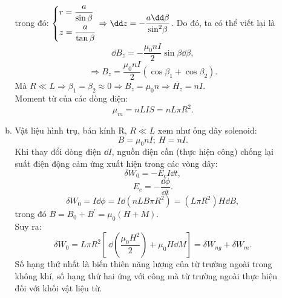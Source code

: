 \begin{loigiai}
\begin{enumerate}[1)]
\begin{enumerate}[a)]
\begin{center}

            \end{center}
            trong đó: $\left\{ \begin{gathered}
              r = \dfrac{a}{{\sin \beta }} \hfill \\
              z = \dfrac{a}{{\tan \beta }} \hfill \\ 
            \end{gathered}  \right. \Rightarrow \dd z =  - \dfrac{{a \dd\beta }}{{{{\sin }^2}\beta }}$. Do đó, ta có thể viết lại là            \[{\dd}{{{B}}_{z}}=-\dfrac{{{\mu }_{0}}{nI}}{2}\sin \beta {\dd}\beta,\]
            \[ \Rightarrow {{{B}}_{z}}=\dfrac{{{\mu }_{0}}{nI}}{2}\left( \cos {{\beta }_{1}}+\cos {{\beta }_{2}} \right).\]
            Mà ${R} \ll {L}\Rightarrow{{\beta }_{1}}={{\beta }_{2}}\approx 0\Rightarrow {{{B}}_{z}}={{\mu }_{0}}{n}\Rightarrow \overline{{{{H}}_{z}}}={nI}.$\\
            Moment từ của các dòng điện: \[{{\mu }_{{m}}}={nLIS}={nL}\pi {{{R}}^{2}}.\]
            \item Vật liệu hình trụ, bán kính R, ${R} \ll {L}$ xem như ống dây solenoid: \[{B}={{\mu }_{0}}{nI};~{H}={nI}.\]
            Khi thay đổi dòng điện $\dd I$, nguồn điện cần (thực hiện công) chống lại suất điện động cảm ứng xuất hiện trong các vòng dây:
            \[\delta {{{W}}_{0}}=-{{{E}}_{{c}}}{I\dd t},\]
             \[{{{E}}_{{c}}}=-\dfrac{{\dd}\phi }{{\dd t}}.\]
            \[\delta {{{W}}_{0}}=I\dd\phi ={I}\dd \left( {nLB}\pi {{{R}}^{2}} \right)=\left( {L}\pi {{{R}}^{2}} \right){H\dd B},\] trong đó ${B}={{{B}}_{0}}+{{{B}}^{\prime }}={{\mu }_{0}}({H}+{M})$.
            \\Suy ra: 
            \[\delta {{{W}}_{0}}={L}\pi {{{R}}^{2}}\left[ ~{\dd}\left( \dfrac{{{\mu }_{0}}{{{H}}^{2}}}{2} \right)+{{\mu }_{0}}{H \dd M} \right]=\delta {{{W}}_{{ng}}}+\delta {{{W}}_{{m}}}.\]
            Số hạng thứ nhất là biến thiên năng lượng của từ trường ngoài trong không khí, số hạng thứ hai ứng với công mà từ trường ngoài thực hiện đối với khối vật liệu từ. 
        \end{enumerate}

\end{enumerate}
\end{loigiai}
